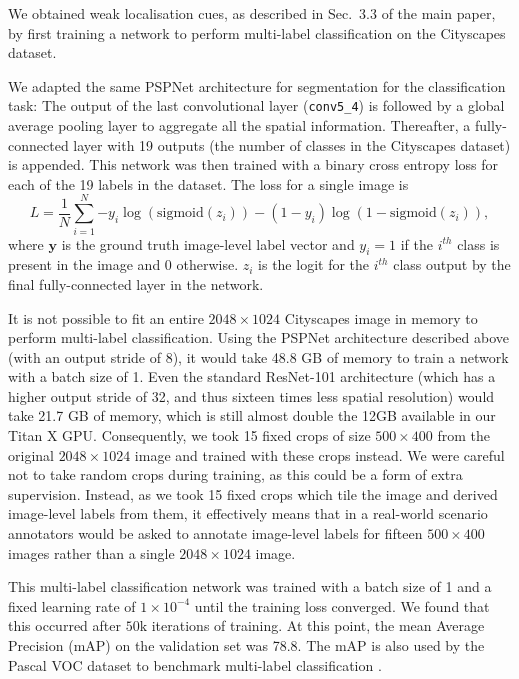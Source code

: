\documentclass[runningheads]{llncs}
\begin{document}
We obtained weak localisation cues, as described in Sec.~3.3 of the main paper, by first training a network to perform multi-label classification on the Cityscapes dataset.

We adapted the same PSPNet \cite{zhao_cvpr_2017} architecture for segmentation for the classification task:
The output of the last convolutional layer (\texttt{conv5\_4}) is followed by a global average pooling layer to aggregate all the spatial information.
Thereafter, a fully-connected layer with 19 outputs (the number of classes in the Cityscapes dataset) is appended.
This network was then trained with a binary cross entropy loss for each of the 19 labels in the dataset.
The loss for a single image is
\begin{equation}
 L = \frac{1}{N} \sum_{i=1}^{N}{ -y_i \log(\text{sigmoid}(z_i)) - (1 - y_i)\log(1 - \text{sigmoid}(z_i)) },
 \end{equation}
where $\mathbf{y}$ is the ground truth image-level label vector and $y_i = 1$ if the $i^{th}$ class is present in the image and 0 otherwise. $z_i$ is the logit for the $i^{th}$ class output by the final fully-connected layer in the network.

It is not possible to fit an entire $2048 \times 1024$ Cityscapes image in memory to perform multi-label classification.
Using the PSPNet architecture described above (with an output stride of 8), it would take 48.8 GB of memory to train a network with a batch size of 1.
Even the standard ResNet-101 architecture \cite{he_cvpr_2016} (which has a higher output stride of 32, and thus sixteen times less spatial resolution) would take 21.7 GB of memory, which is still almost double the 12GB available in our Titan X GPU.
Consequently, we took 15 fixed crops of size $500\times400$ from the original $2048 \times 1024$ image and trained with these crops instead.
We were careful not to take random crops during training, as this could be a form of extra supervision.
Instead, as we took 15 fixed crops which tile the image and derived image-level labels from them, it effectively means that in a real-world scenario annotators would be asked to annotate image-level labels for fifteen $500 \times 400$ images rather than a single $2048 \times 1024$ image.

This multi-label classification network was trained with a batch size of 1 and a fixed learning rate of $1 \times 10^{-4}$ until the training loss converged.
We found that this occurred after $50 \text{k}$ iterations of training.
At this point, the mean Average Precision (mAP) on the validation set was 78.8.
The mAP is also used by the Pascal VOC dataset to benchmark multi-label classification \cite{everingham_2010}.
\end{document}
